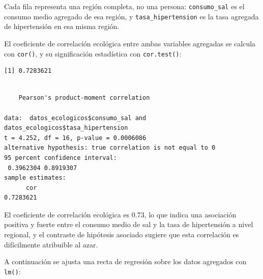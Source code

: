 \documentclass[
  spanish,
  a4paper,
]{scrreport}
\newenvironment{Shaded}{\begin{snugshade}}{\end{snugshade}}
\newcommand{\FunctionTok}[1]{\textcolor[rgb]{0.28,0.35,0.67}{#1}}
\newcommand{\NormalTok}[1]{\textcolor[rgb]{0.00,0.23,0.31}{#1}}
\newcommand{\OtherTok}[1]{\textcolor[rgb]{0.00,0.23,0.31}{#1}}
\newcommand{\SpecialCharTok}[1]{\textcolor[rgb]{0.37,0.37,0.37}{#1}}
\theoremstyle{definition}
\theoremstyle{definition}
\theoremstyle{remark}
\begin{document}
Cada fila representa una región completa, no una persona:
\texttt{consumo\_sal} es el consumo medio agregado de esa región, y
\texttt{tasa\_hipertension} es la tasa agregada de hipertensión en esa
misma región.

El coeficiente de correlación ecológica entre ambas variables agregadas
se calcula con \texttt{cor()}, y su significación estadística con
\texttt{cor.test()}:

\begin{Shaded}
\end{Shaded}

\begin{verbatim}
[1] 0.7283621
\end{verbatim}

\begin{Shaded}
\end{Shaded}

\begin{verbatim}

    Pearson's product-moment correlation

data:  datos_ecologicos$consumo_sal and datos_ecologicos$tasa_hipertension
t = 4.252, df = 16, p-value = 0.0006086
alternative hypothesis: true correlation is not equal to 0
95 percent confidence interval:
 0.3962304 0.8919307
sample estimates:
      cor 
0.7283621 
\end{verbatim}

El coeficiente de correlación ecológica es 0.73, lo que indica una
asociación positiva y fuerte entre el consumo medio de sal y la tasa de
hipertensión a nivel regional, y el contraste de hipótesis asociado
sugiere que esta correlación es difícilmente atribuible al azar.

A continuación se ajusta una recta de regresión sobre los datos
agregados con \texttt{lm()}:
\end{document}
